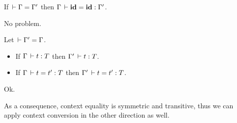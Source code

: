 \documentclass[a4paper,english]{lipics-utf8x}
\begin{document}
  \begin{lemma}
    If $\,\vdash \Gamma = \Gamma'$ then $\Gamma \,\vdash \operatorname{\mathbf{id}} = \operatorname{\mathbf{id}} : \Gamma'$.
  \end{lemma}
  No problem.

  \begin{theorem}
    Let $\,\vdash \Gamma' = \Gamma$.
    \leavevmode
    \begin{itemize}
      \item If $\Gamma \,\vdash t : T$ then $\Gamma' \,\vdash t : T$.
      \item If $\Gamma \,\vdash t = t' : T$ then $\Gamma' \,\vdash t = t' : T$.
    \end{itemize}
  \end{theorem}
  Ok.

  As a consequence, context equality is symmetric and transitive, thus we can
  apply context conversion in the other direction as well.

\end{document}
